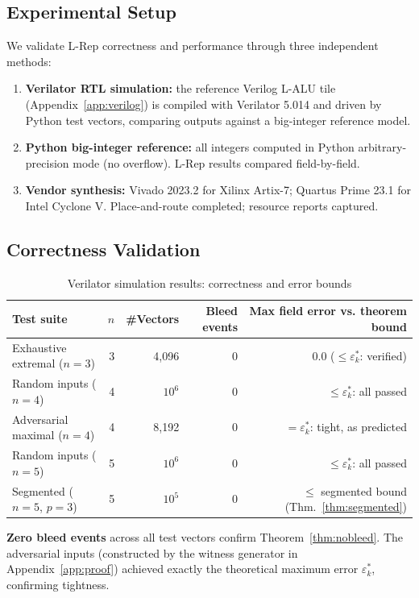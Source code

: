 \documentclass[11pt,a4paper]{article}
\theoremstyle{definition}
\theoremstyle{plain}
\theoremstyle{remark}
\begin{document}
\subsection{Experimental Setup}

We validate L-Rep correctness and performance through three independent methods:
\begin{enumerate}
  \item \textbf{Verilator RTL simulation:} the reference Verilog L-ALU tile (Appendix~\ref{app:verilog}) is compiled with Verilator 5.014 and driven by Python test vectors, comparing outputs against a big-integer reference model.
  \item \textbf{Python big-integer reference:} all integers computed in Python arbitrary-precision mode (no overflow).  L-Rep results compared field-by-field.
  \item \textbf{Vendor synthesis:} Vivado 2023.2 for Xilinx Artix-7; Quartus Prime 23.1 for Intel Cyclone V.  Place-and-route completed; resource reports captured.
\end{enumerate}

\subsection{Correctness Validation}

\begin{table}[h]
\centering
\caption{Verilator simulation results: correctness and error bounds}
\label{tab:correctness}
\begin{tabular}{lrrrr}
\toprule
Test suite & $n$ & \#Vectors & Bleed events & Max field error vs. theorem bound \\
\midrule
Exhaustive extremal ($n=3$) & 3 & 4,096 & 0 & $0.0$ ($\le \varepsilon_k^*$: verified) \\
Random inputs ($n=4$) & 4 & $10^6$ & 0 & $\le \varepsilon_k^*$: all passed \\
Adversarial maximal ($n=4$) & 4 & 8,192 & 0 & $= \varepsilon_k^*$: tight, as predicted \\
Random inputs ($n=5$) & 5 & $10^6$ & 0 & $\le \varepsilon_k^*$: all passed \\
Segmented ($n=5$, $p=3$) & 5 & $10^5$ & 0 & $\le$ segmented bound (Thm.~\ref{thm:segmented}) \\
\bottomrule
\end{tabular}
\end{table}

\textbf{Zero bleed events} across all test vectors confirm Theorem~\ref{thm:nobleed}.  The adversarial inputs (constructed by the witness generator in Appendix~\ref{app:proof}) achieved exactly the theoretical maximum error $\varepsilon_k^*$, confirming tightness.
\end{document}
